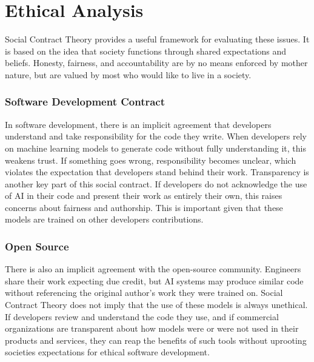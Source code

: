 \documentclass[sigconf, 12pt]{acmart}
\begin{document}
\section{Ethical Analysis}
Social Contract Theory provides a useful framework for evaluating these issues. It is based on the idea that society functions through shared expectations and beliefs. Honesty, fairness, and accountability are by no means enforced by mother nature, but are valued by most who would like to live in a society.
\subsubsection{Software Development Contract}
In software development, there is an implicit agreement that developers understand and take responsibility for the code they write. When developers rely on machine learning models to generate code without fully understanding it, this weakens trust. If something goes wrong, responsibility becomes unclear, which violates the expectation that developers stand behind their work. Transparency is another key part of this social contract. If developers do not acknowledge the use of AI in their code and present their work as entirely their own, this raises concerns about fairness and authorship. This is important given that these models are trained on other developers contributions. ~\cite{(7)}
\subsubsection{Open Source}
There is also an implicit agreement with the open-source community. Engineers share their work expecting due credit, but AI systems may produce similar code without referencing the original author's work they were trained on. Social Contract Theory does not imply that the use of these models is always unethical. If developers review and understand the code they use, and if commercial organizations are transparent about how models were or were not used in their products and services, they can reap the benefits of such tools without uprooting societies expectations for ethical software development.
\end{document}
